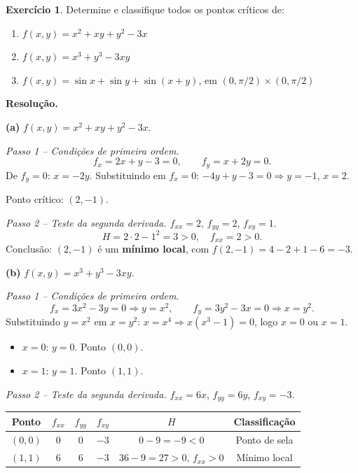 \documentclass[12pt,a4paper]{article}
\theoremstyle{definition}
\newtheorem{exercise}{Exercício}[section]
\theoremstyle{remark}
\begin{document}
\begin{exercise}
  Determine e classifique todos os pontos críticos de:
  \begin{enumerate}[label=(\alph*)]
    \item $f(x,y) = x^2 + xy + y^2 - 3x$
    \item $f(x,y) = x^3 + y^3 - 3xy$
    \item $f(x,y) = \sin x + \sin y + \sin(x+y)$, em
          $(0,\pi/2)\times(0,\pi/2)$
  \end{enumerate}

  \medskip\textbf{Resolução.}

  \textbf{(a)} $f(x,y) = x^2+xy+y^2-3x$.

  \emph{Passo 1 -- Condições de primeira ordem.}
  \[
    f_x = 2x+y-3=0,\qquad f_y = x+2y=0.
  \]
  De $f_y=0$: $x=-2y$. Substituindo em $f_x=0$: $-4y+y-3=0\Rightarrow y=-1$,
  $x=2$.

  Ponto crítico: $(2,-1)$.

  \emph{Passo 2 -- Teste da segunda derivada.}
  $f_{xx}=2$, $f_{yy}=2$, $f_{xy}=1$.
  \[
    H = 2\cdot 2 - 1^2 = 3 > 0,\quad f_{xx}=2>0.
  \]
  Conclusão: $(2,-1)$ é um \textbf{mínimo local}, com $f(2,-1)=4-2+1-6=-3$.

  \bigskip
  \textbf{(b)} $f(x,y)=x^3+y^3-3xy$.

  \emph{Passo 1 -- Condições de primeira ordem.}
  \[
    f_x = 3x^2-3y=0 \Rightarrow y=x^2,\qquad
    f_y = 3y^2-3x=0 \Rightarrow x=y^2.
  \]
  Substituindo $y=x^2$ em $x=y^2$: $x=x^4\Rightarrow x(x^3-1)=0$, logo
  $x=0$ ou $x=1$.
  \begin{itemize}[nosep]
    \item $x=0$: $y=0$. Ponto $(0,0)$.
    \item $x=1$: $y=1$. Ponto $(1,1)$.
  \end{itemize}

  \emph{Passo 2 -- Teste da segunda derivada.}
  $f_{xx}=6x$, $f_{yy}=6y$, $f_{xy}=-3$.

  \begin{center}
  \begin{tabular}{cccccc}
    \toprule
    Ponto & $f_{xx}$ & $f_{yy}$ & $f_{xy}$ & $H$ & Classificação \\
    \midrule
    $(0,0)$ & $0$ & $0$ & $-3$ & $0-9=-9<0$ & Ponto de sela \\
    $(1,1)$ & $6$ & $6$ & $-3$ & $36-9=27>0$, $f_{xx}>0$ & Mínimo local \\
    \bottomrule
  \end{tabular}
  \end{center}


\end{exercise}
\end{document}
